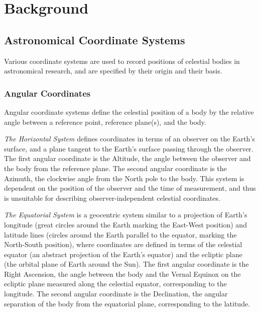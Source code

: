 \documentclass[fleqn,10pt]{olplainarticle}
\numberwithin{equation}{subsection}
\begin{document}
\section{Background}

\subsection{Astronomical Coordinate Systems}

Various coordinate systems are used to record positions of celestial bodies in astronomical research, and are specified by their origin and their basis.

\subsubsection{Angular Coordinates}\label{sec:angcoord}
Angular coordinate systems define the celestial position of a body by the relative angle between a reference point, reference plane(s), and the body.

\emph{The Horizontal System} defines coordinates in terms of an observer on the Earth's surface, and a plane tangent to the Earth's surface passing through the observer. \\The first angular coordinate is the Altitude, the angle between the observer and the body from the reference plane. The second angular coordinate is the Azimuth, the clockwise angle from the North pole to the body. This system is dependent on the position of the observer and the time of measurement, and thus is unsuitable for describing observer-independent celestial coordinates.\cite{Karttunen2016-gt}

\emph{The Equatorial System} is a geocentric system similar to a projection of Earth's longitude (great circles around the Earth marking the East-West position) and latitude lines (circles around the Earth parallel to the equator, marking the North-South position), where coordinates are defined in terms of the celestial equator (an abstract projection of the Earth's equator) and the ecliptic plane (the orbital plane of Earth around the Sun). The first angular coordinate is the Right Ascension, the angle between the body and the Vernal Equinox on the ecliptic plane measured along the celestial equator, corresponding to the longitude. The second angular coordinate is the Declination, the angular separation of the body from the equatorial plane, corresponding to the latitude.\cite{Karttunen2016-gt}

\end{document}
